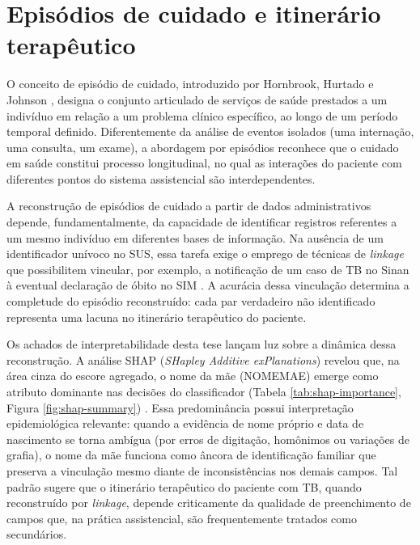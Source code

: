 \section{Episódios de cuidado e itinerário terapêutico}\label{sec:episodios-itinerario}

O conceito de episódio de cuidado, introduzido por Hornbrook, Hurtado e Johnson \citeyearpar{Hornbrook1985episodes}, designa o conjunto articulado de serviços de saúde prestados a um indivíduo em relação a um problema clínico específico, ao longo de um período temporal definido. Diferentemente da análise de eventos isolados (uma internação, uma consulta, um exame), a abordagem por episódios reconhece que o cuidado em saúde constitui processo longitudinal, no qual as interações do paciente com diferentes pontos do sistema assistencial são interdependentes.

A reconstrução de episódios de cuidado a partir de dados administrativos depende, fundamentalmente, da capacidade de identificar registros referentes a um mesmo indivíduo em diferentes bases de informação. Na ausência de um identificador unívoco no SUS, essa tarefa exige o emprego de técnicas de \textit{linkage} que possibilitem vincular, por exemplo, a notificação de um caso de TB no Sinan à eventual declaração de óbito no SIM \cite{Coeli2021suboptimal}. A acurácia dessa vinculação determina a completude do episódio reconstruído: cada par verdadeiro não identificado representa uma lacuna no itinerário terapêutico do paciente.

Os achados de interpretabilidade desta tese lançam luz sobre a dinâmica dessa reconstrução. A análise SHAP (\textit{SHapley Additive exPlanations}) revelou que, na área cinza do escore agregado, o nome da mãe (NOMEMAE) emerge como atributo dominante nas decisões do classificador (Tabela \ref{tab:shap-importance}, Figura \ref{fig:shap-summary}) \cite{Lundberg2017shap, Lundberg2020treeshap}. Essa predominância possui interpretação epidemiológica relevante: quando a evidência de nome próprio e data de nascimento se torna ambígua (por erros de digitação, homônimos ou variações de grafia), o nome da mãe funciona como âncora de identificação familiar que preserva a vinculação mesmo diante de inconsistências nos demais campos. Tal padrão sugere que o itinerário terapêutico do paciente com TB, quando reconstruído por \textit{linkage}, depende criticamente da qualidade de preenchimento de campos que, na prática assistencial, são frequentemente tratados como secundários.

